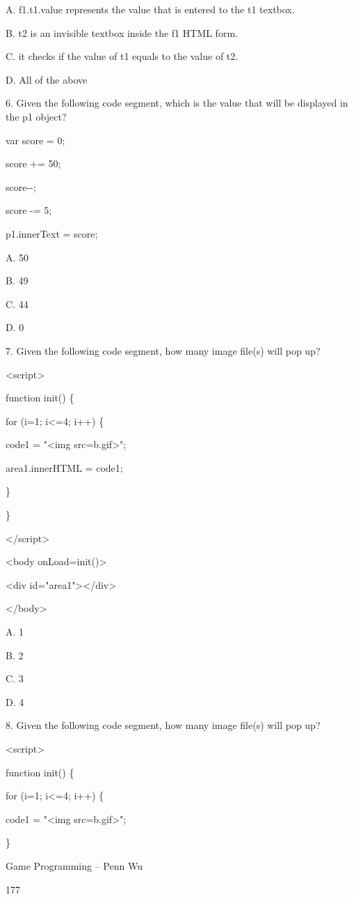 \documentclass[
]{article}
\begin{document}
A. f1.t1.value represents the value that is entered to the t1 textbox.

B. t2 is an invisible textbox inside the f1 HTML form.

C. it checks if the value of t1 equals to the value of t2.

D. All of the above

6. Given the following code segment, which is the value that will be
displayed in the p1 object?

var score = 0;

score += 50;

score-\/-;

score -= 5;

p1.innerText = score;

A. 50

B. 49

C. 44

D. 0

7. Given the following code segment, how many image file(s) will pop up?

\textless script\textgreater{}

function init() \{

for (i=1; i\textless=4; i++) \{

code1 = "\textless img src=b.gif\textgreater";

area1.innerHTML = code1;

\}

\}

\textless/script\textgreater{}

\textless body onLoad=init()\textgreater{}

\textless div id="area1"\textgreater\textless/div\textgreater{}

\textless/body\textgreater{}

A. 1

B. 2

C. 3

D. 4

8. Given the following code segment, how many image file(s) will pop up?

\textless script\textgreater{}

function init() \{

for (i=1; i\textless=4; i++) \{

code1 = "\textless img src=b.gif\textgreater";

\}

Game Programming -- Penn Wu

177
\end{document}
